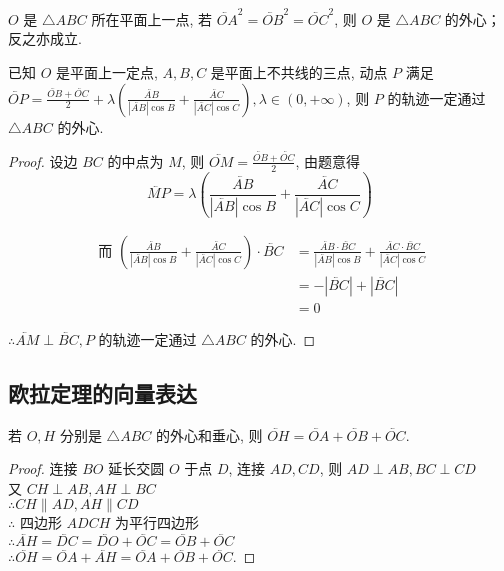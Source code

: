 \begin{proposition}
    $O$ 是 $\triangle ABC$ 所在平面上一点, 若 $\lvec{OA}^{2}=\lvec{OB}^{2}=\lvec{OC}^{2}$, 则 $O$ 是 $\triangle ABC$ 的外心；反之亦成立.
\end{proposition}

\begin{proposition}
    已知 $O$ 是平面上一定点, $A, B, C$ 是平面上不共线的三点, 动点 $P$ 满足 $\lvec{OP}=\frac{\lvec{OB}+\lvec{OC}}{2}+\lambda\left(\frac{\lvec{AB}}{|\lvec{AB}| \cos B}+\frac{\lvec{AC}}{|\lvec{AC}| \cos C}\right), \lambda \in(0,+\infty)$, 则 $P$ 的轨迹一定通过 $\triangle ABC$ 的外心.
\end{proposition}

\begin{proof}
    设边 $BC$ 的中点为 $M$, 则 $\lvec{OM}=\frac{\lvec{OB}+\lvec{OC}}{2}$, 由题意得
    $$
        \lvec{MP}=\lambda\left(\frac{\lvec{AB}}{|\lvec{AB}| \cos B}+\frac{\lvec{AC}}{|\lvec{AC}| \cos C}\right)
    $$

    \begin{align*}
        \text { 而 }
        \left(\frac{\lvec{AB}}{|\lvec{AB}| \cos B}+\frac{\lvec{AC}}{|\lvec{AC}| \cos C}\right) \cdot \lvec{BC} & =\frac{\lvec{AB} \cdot \lvec{BC}}{|\lvec{AB}| \cos B}+\frac{\lvec{AC} \cdot \lvec{BC}}{|\lvec{AC}| \cos C} \\
                                                                                                               & =-|\lvec{BC}|+|\lvec{BC}|                                                                                  \\
                                                                                                               & =0
    \end{align*}

    $\therefore \lvec{AM} \perp \lvec{BC}, P$ 的轨迹一定通过 $\triangle ABC$ 的外心.
\end{proof}

\subsection{欧拉定理的向量表达}
\begin{proposition}
    若 $O, H$ 分别是 $\triangle ABC$ 的外心和垂心, 则 $\lvec{OH}=\lvec{OA}+\lvec{OB}+\lvec{OC}$.
\end{proposition}

\begin{proof}
    连接 $BO$ 延长交圆 $O$ 于点 $D$, 连接 $AD, CD$, 则 $AD \perp AB, BC \perp CD$\\
    又 $CH \perp AB, AH \perp BC$\\
    $\therefore CH \parallel AD, AH \parallel CD$\\
    $\therefore$ 四边形 $ADCH$ 为平行四边形\\
    $\therefore \lvec{AH}=\lvec{DC}=\lvec{DO}+\lvec{OC}=\lvec{OB}+\lvec{OC}$\\
    $\therefore \lvec{OH}=\lvec{OA}+\lvec{AH}=\lvec{OA}+\lvec{OB}+\lvec{OC}$.
\end{proof}

